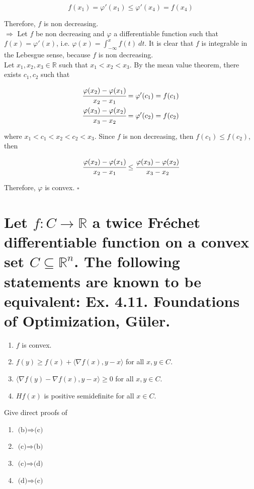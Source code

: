 \documentclass[10pt]{article}
\begin{document}
$$ f(x_1) = \varphi'(x_1) \leq \varphi'(x_4) = f(x_4)$$

Therefore, $f$ is non decreasing.\\

$\Rightarrow$ Let $f$ be non decreasing and $\varphi$ a differentiable function such that $f(x) = \varphi'(x)$, i.e. $\varphi(x) = \int_{-\infty}^x f(t) \ dt$. It is clear that $f$ is integrable in the Lebesgue sense, because $f$ is non decreasing.\\


Let $x_1, x_2, x_3 \in \mathbb{R}$ such that $x_1 < x_2 < x_3$. By the mean value theorem, there exists $c_1, c_2$ such that 

\begin{align*}
  \cfrac{\varphi(x_2) -\varphi(x_1)}{x_2-x_1} = \varphi'(c_1) = f(c_1)\\
  \cfrac{\varphi(x_3) -\varphi(x_2)}{x_3-x_2} = \varphi'(c_2) = f(c_2)
\end{align*}

where $x_1 < c_1 < x_2 < c_2 < x_3$. Since $f$ is non decreasing, then $f(c_1) \leq f(c_2)$, then 

$$ \cfrac{\varphi(x_2) -\varphi(x_1)}{x_2-x_1} \leq \cfrac{\varphi(x_3) -\varphi(x_2)}{x_3-x_2}$$

Therefore, $\varphi$ is convex. $\square$


\section{Let $f: C \rightarrow \mathbb{R}$ a twice Fréchet differentiable function on a convex set $C \subseteq \mathbb{R}^n$. The following statements are known to be equivalent: Ex. 4.11. Foundations of Optimization, Güler.}

\begin{enumerate}[label=(\alph*)]
  \item $f$ is convex.
  \item $f(y) \geq f(x) + \langle \nabla f(x), y - x \rangle$ for all $x, y \in C$.
  \item $\langle \nabla f(y) - \nabla f(x), y - x \rangle \geq 0$ for all $x, y \in C$.
  \item $Hf(x)$ is positive semidefinite for all $x \in C$.
\end{enumerate}

Give direct proofs of 
\begin{enumerate}[label=(\alph*)]
  \item $\text{(b)} \Rightarrow \text{(c)}$
  \item $\text{(c)} \Rightarrow \text{(b)}$
  \item $\text{(c)} \Rightarrow \text{(d)}$
  \item $\text{(d)} \Rightarrow \text{(c)}$
\end{enumerate}
\end{document}
